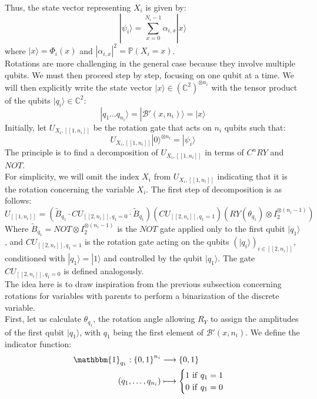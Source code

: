 Thus, the state vector representing $X_i$ is given by:
\[|\psi_i\rangle = \sum_{x=0}^{N_i-1}\alpha_{i,x}|x\rangle\]
where $|x\rangle = \Phi_i(x)$ and $|\alpha_{i,x}|^2 = \mathbb{P}(X_i=x)$. 
\\
Rotations are more challenging in the general case because they involve multiple qubits. We must then proceed step by step, focusing on one qubit at a time. 
We will then explicitly write the state vector $|x\rangle \in (\mathbb{C}^2)^{\otimes n_i}$ with the tensor product of the qubits $|q_i\rangle \in \mathbb{C}^2$:
\[|q_1 \hdots q_{n_i}\rangle = |\mathscr{B}'(x,n_i)\rangle = |x\rangle \]
Initially, let $U_{X_i, [\![1,n_i]\!]}$ be the rotation gate that acts on $n_i$ qubits such that:
\[U_{X_i, [\![1,n_i]\!]}|0\rangle^{\otimes n_i} = |\psi_i\rangle\]
The principle is to find a decomposition of $U_{X_i, [\![1,n_i]\!]}$ in terms of $C^nRY$ and $NOT$. 
\\
For simplicity, we will omit the index $X_i$ from $U_{X_i, [\![1,n_i]\!]}$ indicating that it is the rotation concerning the variable $X_i$. The first step of decomposition is as follows:
\[U_{[\![1,n_i]\!]} = (\tilde{B}_{q_1} \cdot CU_{[\![2,n_i]\!],q_1=0} \cdot \tilde{B}_{q_1})(CU_{[\![2,n_i]\!],q_1=1})(RY(\theta_{q_1})\otimes I_2^{\otimes (n_i-1)})\]
Where $\tilde{B}_{q_1} = NOT \otimes I_2^{\otimes (n_i-1)}$ is the $NOT$ gate applied only to the first qubit $|q_1\rangle$, and $CU_{[\![2,n_i]\!],q_1=1}$ is the rotation gate acting on the qubits $(|q_i\rangle)_{i\in[\![2,n_i]\!]}$, conditioned with $|q_1\rangle=|1\rangle$ and controlled by the qubit $|q_1\rangle$. The gate $CU_{[\![2,n_i]\!],q_1=0}$ is defined analogously. 
\\
The idea here is to draw inspiration from the previous subsection concerning rotations for variables with parents to perform a binarization of the discrete variable.
\\
First, let us calculate $\theta_{q_1}$, the rotation angle allowing $R_Y$ to assign the amplitudes of the first qubit $|q_1\rangle$, with $q_1$ being the first element of $\mathscr{B}'(x,n_i)$. We define the indicator function:
\begin{align*}
    \mathbbm{1}_{q_1} : {\{0,1\}}^{n_i} &\longrightarrow \{0,1\} \\
    (q_1, \hdots ,q_{n_i}) &\longmapsto
 \begin{cases}
 1 \ \mathrm{if} \ q_1 = 1 \\
 0 \ \mathrm{if} \ q_1 = 0 
 \end{cases}
\end{align*}
